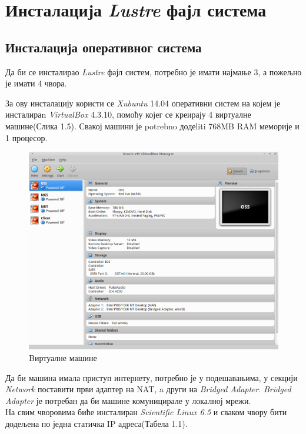 \section{Инсталација   \textit{Lustre} фајл система}
\subsection{Инсталација оперативног система}

Да би се инсталирао \textit{Lustre} фајл систем, потребно је имати најмање 3, а пожељно је имати 4 чвора. 

За ову инсталацију користи се \textit{Xubuntu} 14.04 оперативни систем на којем је инсталираn \textit{VirtualBox} 4.3.10, помоћу којег се креирају 4 виртуалне машине(Слика 1.5). Свакој машини је potrebno додеliti 768MB RAM меморије и 1 процесор.
\begin{figure}[h!]
  \centering
      \includegraphics[width=1\textwidth]{slike/virtualbox.png}
  \caption{Bиртуалне машине}
\end{figure}
Да би машина имала приступ интернету, потребно је у подешавањима, у секцији \textit{Network} поставити први адаптер на \gls{NAT}, a други на \textit{Bridged Adapter}. 	\textit{Bridged Adapter} је потребан да би машине комуницирале у локалној мрежи.
~\\[3cm]
На свим чворовима биће инсталиран \textit{Scientific Linux 6.5} и сваком чвору бити додељена по једна статичка IP адреса(Табела 1.1).

